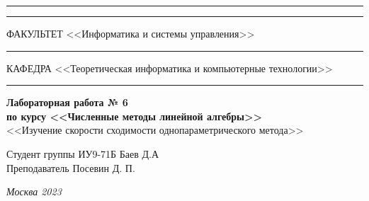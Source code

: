 \documentclass[a4paper, 14pt]{extarticle}
\begin{document}
\begin{titlepage}
\vspace{-25pt}
\hspace{-35pt}\rule{\textwidth}{2.3pt}

\vspace*{-20.3pt}
\hspace{-35pt}\rule{\textwidth}{0.4pt}

\vspace{1.5ex}
\hspace{-35pt} \noindent \small ФАКУЛЬТЕТ\hspace{80pt} <<Информатика и системы управления>>

\vspace*{-16pt}
\hspace{47pt}\rule{0.83\textwidth}{0.4pt}

\vspace{0.5ex}
\hspace{-35pt} \noindent \small КАФЕДРА\hspace{50pt} <<Теоретическая информатика и компьютерные технологии>>

\vspace*{-16pt}
\hspace{30pt}\rule{0.866\textwidth}{0.4pt}

\vspace{11em}

\begin{center}
\Large {\bf Лабораторная работа № 6} \\
\large {\bf по курсу <<Численные методы линейной алгебры>>} \\
\large <<Изучение скорости сходимости
однопараметрического метода>>
\end{center}\normalsize

\vspace{8em}


\begin{flushright}
  {Студент группы ИУ9-71Б Баев Д.А \hspace*{15pt}\\
  \vspace{2ex}
  Преподаватель Посевин Д. П.\hspace*{15pt}}
\end{flushright}

\bigskip

\vfill


\begin{center}
\textsl{Москва 2023}
\end{center}
\end{titlepage}
\end{document}
